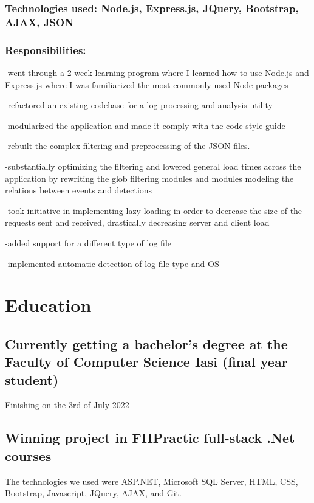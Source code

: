 \documentclass[a4paper,hidelinks,11pt]{article}
\begin{document}
\subsubsection{Technologies used: Node.js, Express.js, JQuery, Bootstrap, AJAX, JSON}
\subsubsection{Responsibilities:}
-went through a 2-week learning program where I learned how to use Node.js and Express.js where I was familiarized the most commonly used Node packages

-refactored an existing codebase for a log processing and analysis utility

-modularized the application and made it comply with the code style guide

-rebuilt the complex filtering and preprocessing of the JSON files.

-substantially optimizing the filtering and lowered general load times across the application by rewriting the glob filtering modules and modules modeling the relations between events and detections

-took initiative in implementing lazy loading in order to decrease the size of the requests sent and received, drastically decreasing server and client load

-added support for a different type of log file

-implemented automatic detection of log file type and OS

\section{Education}
\subsection{Currently getting a bachelor's degree at 
the Faculty of Computer Science Iasi (final year student)}
Finishing on the 3rd of July 2022

\subsection{Winning project in FIIPractic full-stack .Net courses}

The technologies we used were ASP.NET, Microsoft SQL Server, HTML, CSS, Bootstrap, Javascript,
JQuery, AJAX, and Git. 
\end{document}
